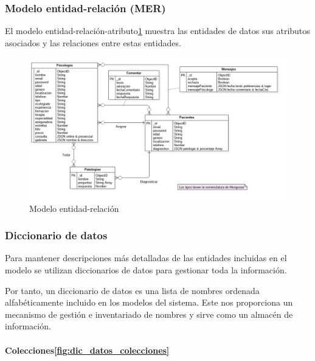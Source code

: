 \subsubsection{Modelo entidad-relación (MER)}
El modelo entidad-relación-atributo\ref{fig:mod_datos_mer} muestra las entidades de datos sus atributos asociados y las relaciones entre estas entidades. 


\begin{figure}[htbp] 
    \centering
    \includegraphics[width=1\textwidth]{figuras/bbdd_mod_MER.png}
    \caption{Modelo entidad-relación}
    \label{fig:mod_datos_mer}
\end{figure}

\subsubsection{Diccionario de datos}
Para mantener descripciones más detalladas de las entidades incluidas en el modelo se utilizan diccionarios de datos para gestionar toda la información.


Por tanto, un diccionario de datos es una lista de nombres ordenada alfabéticamente incluido en los modelos del sistema. Este nos proporciona un mecanismo de gestión e inventariado de nombres y sirve como un almacén de información.


\paragraph{Colecciones\ref{fig:dic_datos_colecciones}}

